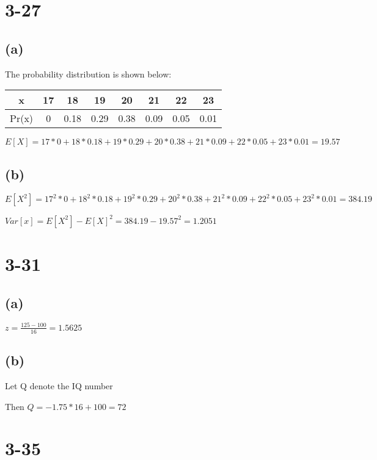 \documentclass[12pt]{article}
\begin{document}
\begin{spacing}{2.0}
\section*{3-27}

\subsection*{(a)}

The probability distribution is shown below:

\begin{tabular}{|c|c|c|c|c|c|c|c|}
  \hline
  x & 17 & 18 & 19 & 20 & 21 & 22 & 23 \\
  \hline
  Pr(x) & 0 & 0.18 & 0.29 & 0.38 & 0.09 & 0.05 & 0.01 \\
  \hline
\end{tabular}

$E[X]= 17*0 +18*0.18 + 19*0.29 +20*0.38 +21*0.09 +22*0.05 +23*0.01 = 19.57$

\subsection*{(b)}

$E[X^2] = 17^2*0 +18^2*0.18 + 19^2*0.29 +20^2*0.38 +21^2*0.09 +22^2*0.05 +23^2*0.01= 384.19$

$Var[x]=E[X^2]- E[X]^2= 384.19-19.57^2 = 1.2051$

\section*{3-31}

\subsection*{(a)}

$z=\frac{125-100}{16}= 1.5625$

\subsection*{(b)}

Let Q denote the IQ number

Then $Q= -1.75*16 +100= 72$

\section*{3-35}


\end{spacing}
\end{document}
